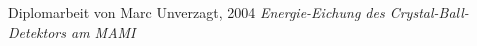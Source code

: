 \documentclass[a4paper,11pt,oneside,final,german,openbib,pdftex]{scrbook}
\begin{document}
{\begin{appendix}
\listoffigures



\listoftables






\renewcommand{\bibname}{\bfont Literaturverzeichnis} 

\begin{thebibliography}{99}
	
 Diplomarbeit von Marc Unverzagt, 2004 {\em Energie-Eichung des Crystal-Ball-Detektors am MAMI}


\end{thebibliography}
\end{appendix}}
\end{document}
